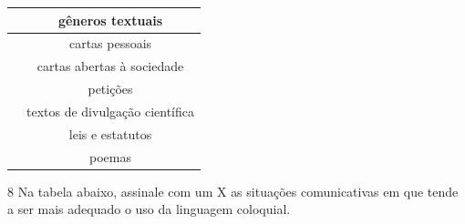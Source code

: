 \begin{table}[]
\begin{tabular}{c|c|}
\cline{2-2}
\rowcolor[HTML]{FFFFFF} 
\textbf{} & \cellcolor[HTML]{DAE8FC}\textbf{gêneros textuais} \\ \hline
\multicolumn{1}{|c|}{} & cartas pessoais \\ \hline
\rowcolor[HTML]{ECF4FF} 
\multicolumn{1}{|c|}{\cellcolor[HTML]{ECF4FF}} & cartas abertas à sociedade \\ \hline
\multicolumn{1}{|c|}{} & petições \\ \hline
\rowcolor[HTML]{ECF4FF} 
\multicolumn{1}{|c|}{\cellcolor[HTML]{ECF4FF}} & textos de divulgação científica \\ \hline
\multicolumn{1}{|c|}{} & leis e estatutos \\ \hline
\multicolumn{1}{|c|}{} & poemas \\ \hline
\end{tabular}
\end{table}


\num{8} Na tabela abaixo, assinale com um X as situações comunicativas em que tende a ser mais adequado
o uso da linguagem coloquial.

